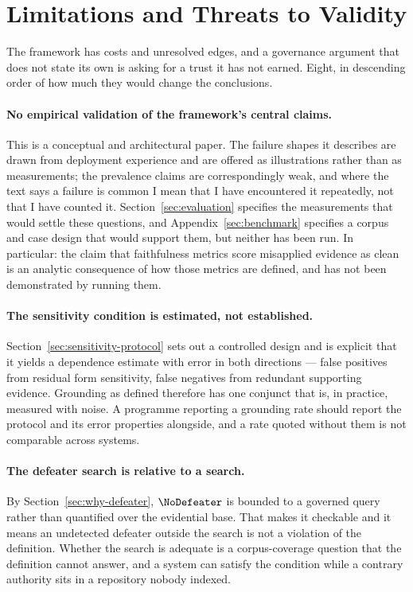 \section{Limitations and Threats to Validity}
\label{sec:limitations}

The framework has costs and unresolved edges, and a governance argument that does not
state its own is asking for a trust it has not earned. Eight, in descending order of how
much they would change the conclusions.

\paragraph{No empirical validation of the framework's central claims.} This is a
conceptual and architectural paper. The failure shapes it describes are drawn from
deployment experience and are offered as illustrations rather than as measurements; the
prevalence claims are correspondingly weak, and where the text says a failure is common I
mean that I have encountered it repeatedly, not that I have counted it.
Section~\ref{sec:evaluation} specifies the measurements that would settle these
questions, and Appendix~\ref{sec:benchmark} specifies a corpus and case design that would
support them, but neither has been run. In particular: the claim that faithfulness metrics
score misapplied evidence as clean is an analytic consequence of how those metrics are
defined, and has not been demonstrated by running them.

\paragraph{The sensitivity condition is estimated, not established.}
Section~\ref{sec:sensitivity-protocol} sets out a controlled design and is explicit that
it yields a dependence estimate with error in both directions --- false positives from
residual form sensitivity, false negatives from redundant supporting evidence. Grounding
as defined therefore has one conjunct that is, in practice, measured with noise. A
programme reporting a grounding rate should report the protocol and its error properties
alongside, and a rate quoted without them is not comparable across systems.

\paragraph{The defeater search is relative to a search.} By
Section~\ref{sec:why-defeater}, $\NoDefeater$ is bounded to a governed query rather than
quantified over the evidential base. That makes it checkable and it means an undetected
defeater outside the search is not a violation of the definition. Whether the search is
adequate is a corpus-coverage question that the definition cannot answer, and a system
can satisfy the condition while a contrary authority sits in a repository nobody indexed.

